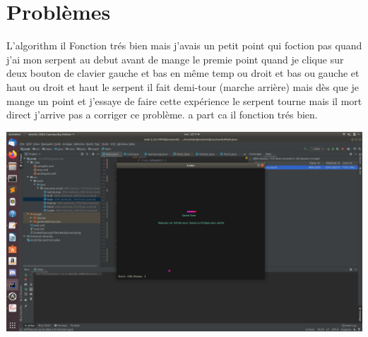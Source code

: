 \documentclass[a4paper]{report}
\begin{document}
\section{Problèmes}
\begin{onehalfspace} 
\begin{description}
L'algorithm il Fonction trés bien mais j'avais un petit point qui foction pas quand j'ai mon serpent au debut avant de mange le premie point quand je clique sur deux bouton de clavier gauche et bas en même temp ou droit et bas ou gauche et haut ou droit et haut le serpent il fait demi-tour (marche arrière) mais dès que je mange un point et j'essaye de faire cette expérience le serpent tourne mais il mort direct j'arrive pas a corriger ce problème. a part ca il fonction trés bien.\\
\end{description}
\end{onehalfspace}
\begin{onehalfspace} 
\begin{description}
\begin{center}
 \includegraphics[width=13.5cm]{exp.png}
\end{center}
\end{description}
\end{onehalfspace}
\end{document}
